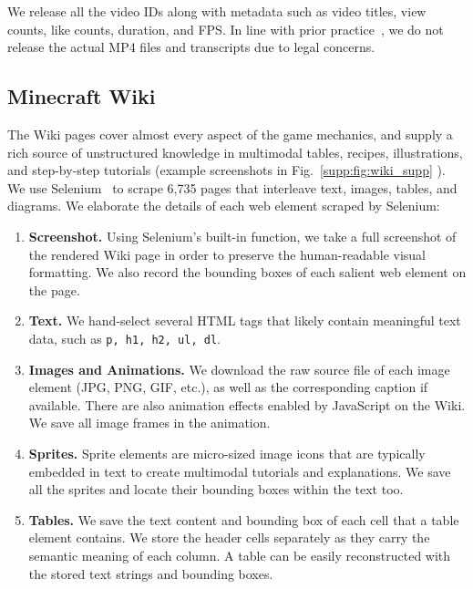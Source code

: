 We release all the video IDs along with metadata such as video titles, view counts, like counts, duration, and FPS. In line with prior practice~\cite{kay2017kinetics}, we do not release the actual MP4 files and transcripts due to legal concerns.

\subsection{Minecraft Wiki}
\label{supp:sec:dataset-wiki}


The Wiki pages cover almost every aspect of the game mechanics, and supply a rich source of unstructured knowledge in multimodal tables, recipes, illustrations, and step-by-step tutorials (example screenshots in Fig.~\ref{supp:fig:wiki_supp} ). We use Selenium~\cite{selenium} to scrape 6,735 pages that interleave text, images, tables, and diagrams. 
We elaborate the details of each web element scraped by Selenium:

\begin{enumerate}[label=\alph*)]
    \item \textbf{Screenshot.} Using Selenium's built-in function, we take a full screenshot of the rendered Wiki page in order to preserve the human-readable visual formatting. We also record the bounding boxes of each salient web element on the page. 
    \item \textbf{Text.} We hand-select several HTML tags that likely contain meaningful text data, such as \texttt{p, h1, h2, ul, dl}.
    \item \textbf{Images and Animations.} We download the raw source file of each image element (JPG, PNG, GIF, etc.), as well as the corresponding caption if available. There are also animation effects enabled by JavaScript on the Wiki. We save all image frames in the animation. 
    \item \textbf{Sprites.} Sprite elements are micro-sized image icons that are typically embedded in text to create multimodal tutorials and explanations. We save all the sprites and locate their bounding boxes within the text too. 
    \item \textbf{Tables.} We save the text content and bounding box of each cell that a table element contains. We store the header cells separately as they carry the semantic meaning of each column. A table can be easily reconstructed with the stored text strings and bounding boxes. 
\end{enumerate}


